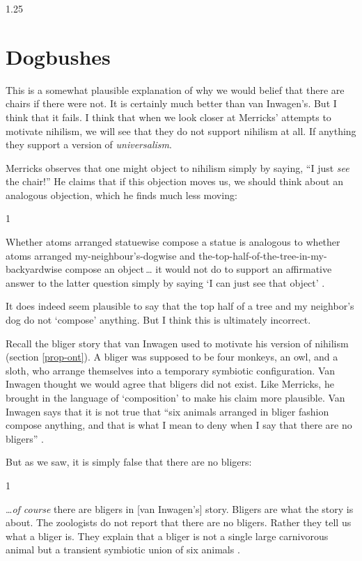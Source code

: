 \documentclass[11pt]{article}
\newenvironment{squote}{%
\begin{spacing}{1}
       	\begin{list}{}{%
\setlength{\labelwidth}{0pt}%
\rightmargin\leftmargin%
}
\item\relax
}{%
\end{list}%
\end{spacing}
}
\begin{document}
\begin{spacing}{1.25}
\section{Dogbushes}
\label{dogbush}
This is a somewhat plausible explanation of why we would belief that
there are chairs if there were not.  It is certainly much better than
van Inwagen's.  But I think that it fails.  I think that when we look
closer at Merricks' attempts to motivate nihilism, we will see that
they do not support nihilism at all.  If anything they support a
version of {\em universalism}.

Merricks observes that one might object to nihilism simply by saying,
``I just {\em see} the chair!''  He claims that if this objection
moves us, we should think about an analogous objection, which he finds
much less moving:

\begin{squote}
Whether atoms arranged statuewise compose a statue is analogous to
whether atoms arranged my-neighbour's-dogwise and
the-top-half-of-the-tree-in-my-backyardwise compose an object\,\ldots
it would not do to support an affirmative answer to the latter
question simply by saying `I can just see that object'
\citeyearpar[73]{merricks2001a}.
\end{squote}

It does indeed seem plausible to say that the top half of a tree and
my neighbor's dog do not `compose' anything.  But I think this is
ultimately incorrect.

Recall the bliger story that van Inwagen used to motivate his version
of nihilism (section \ref{prop-ont}).  A bliger was supposed to be
four monkeys, an owl, and a sloth, who arrange themselves into a
temporary symbiotic configuration.  Van Inwagen thought we would agree
that bligers did not exist.  Like Merricks, he brought in the language
of `composition' to make his claim more plausible.  Van Inwagen says
that it is not true that ``six animals arranged in bliger fashion
compose anything, and that is what I mean to deny when I say that
there are no bligers'' \citeyearpar[104]{inwagen1995}.

But as we saw, it is simply false that there are no bligers:

\begin{squote}
\ldots {\em of course} there are bligers in [van Inwagen's] story.
Bligers are what the story is about.  The zoologists do not report
that there are no bligers.  Rather they tell us what a bliger is.
They explain that a bliger is not a single large carnivorous animal
but a transient symbiotic union of six animals
\citep[704]{rosenberg1993}.
\end{squote}


\end{spacing}
\end{document}
